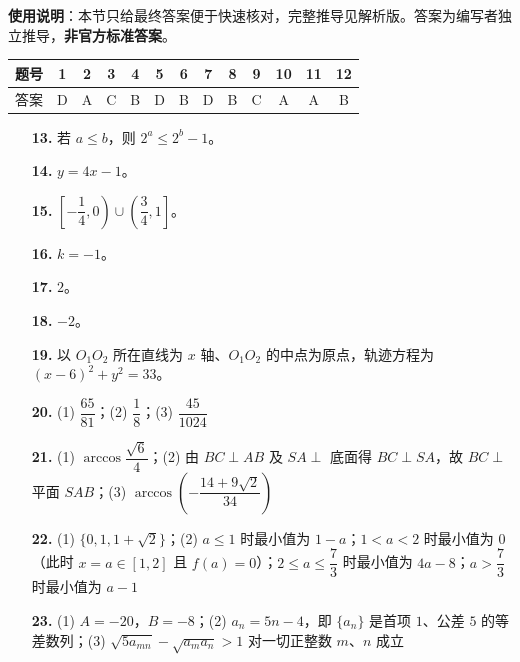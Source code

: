 
\begin{gknotice}
\textbf{使用说明}：本节只给最终答案便于快速核对，完整推导见解析版。答案为编写者独立推导，\textbf{非官方标准答案}。
\end{gknotice}

\begin{center}\begin{tabular}{ccccccccccccc}
\toprule
题号 & 1 & 2 & 3 & 4 & 5 & 6 & 7 & 8 & 9 & 10 & 11 & 12 \\
\midrule
答案 & D & A & C & B & D & B & D & B & C & A & A & B \\
\bottomrule
\end{tabular}\end{center}

\begin{itemize}[leftmargin=2.6em]
  \item[\textbf{13.}] 若 $a \leqslant b$，则 $2^a \leqslant 2^b - 1$。
  \item[\textbf{14.}] $y = 4x - 1$。
  \item[\textbf{15.}] $\left[-\dfrac{1}{4}, 0\right) \cup \left(\dfrac{3}{4}, 1\right]$。
  \item[\textbf{16.}] $k = -1$。
  \item[\textbf{17.}] $2$。
  \item[\textbf{18.}] $-2$。
\end{itemize}

\begin{itemize}[leftmargin=2.6em]
  \item[\textbf{19.}] 以 $O_1O_2$ 所在直线为 $x$ 轴、$O_1O_2$ 的中点为原点，轨迹方程为 $(x - 6)^2 + y^2 = 33$。
  \item[\textbf{20.}] (1) $\dfrac{65}{81}$；(2) $\dfrac{1}{8}$；(3) $\dfrac{45}{1024}$
  \item[\textbf{21.}] (1) $\arccos\dfrac{\sqrt{6}}{4}$；(2) 由 $BC \perp AB$ 及 $SA \perp$ 底面得 $BC \perp SA$，故 $BC \perp$ 平面 $SAB$；(3) $\arccos\left(-\dfrac{14 + 9\sqrt{2}}{34}\right)$
  \item[\textbf{22.}] (1) $\{0, 1, 1 + \sqrt{2}\}$；(2) $a\le 1$ 时最小值为 $1-a$；$1<a<2$ 时最小值为 $0$（此时 $x=a\in[1,2]$ 且 $f(a)=0$）；$2\le a\le\dfrac73$ 时最小值为 $4a-8$；$a>\dfrac73$ 时最小值为 $a-1$
  \item[\textbf{23.}] (1) $A = -20$，$B = -8$；(2) $a_n = 5n - 4$，即 $\{a_n\}$ 是首项 $1$、公差 $5$ 的等差数列；(3) $\sqrt{5a_{mn}} - \sqrt{a_m a_n} > 1$ 对一切正整数 $m$、$n$ 成立
\end{itemize}

